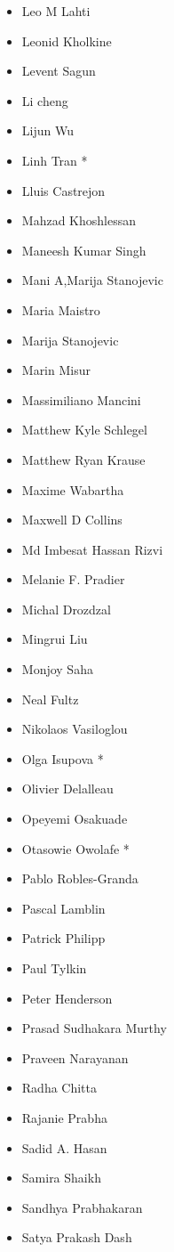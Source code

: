 \begin{multicols}{3}
\begin{itemize}[label={}]
\item Leo M Lahti
\item Leonid Kholkine
\item Levent Sagun
\item Li cheng
\item Lijun Wu
\item Linh Tran *
\item Lluis Castrejon
\item Mahzad Khoshlessan
\item Maneesh Kumar Singh
\item Mani A,Marija Stanojevic
\item Maria Maistro
\item Marija Stanojevic
\item Marin Misur
\item Massimiliano Mancini
\item Matthew Kyle Schlegel
\item Matthew Ryan Krause
\item Maxime Wabartha
\item Maxwell D Collins
\item Md Imbesat Hassan Rizvi
\item Melanie F. Pradier
\item Michal Drozdzal
\item Mingrui Liu
\item Monjoy Saha
\item Neal Fultz
\item Nikolaos Vasiloglou
\item Olga Isupova *
\item Olivier Delalleau
\item Opeyemi Osakuade
\item Otasowie Owolafe *
\item Pablo Robles-Granda
\item Pascal Lamblin
\item Patrick Philipp
\item Paul Tylkin
\item Peter Henderson
\item Prasad Sudhakara Murthy
\item Praveen Narayanan
\item Radha Chitta
\item Rajanie Prabha
\item Sadid A. Hasan
\item Samira Shaikh
\item Sandhya Prabhakaran
\item Satya Prakash Dash

\end{itemize}
\end{multicols}
